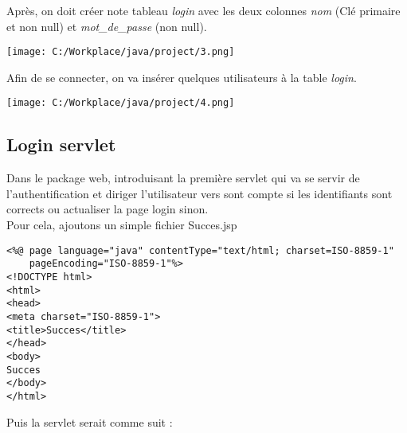\documentclass[12]{article}
\begin{document}
Après, on doit créer note tableau \textit{login} avec les deux colonnes \textit{nom} (Clé primaire et non null) et \textit{mot\_de\_passe} (non null).\\

\begin{center}
\texttt{[image: C:/Workplace/java/project/3.png]}
\end{center}

Afin de se connecter, on va insérer quelques utilisateurs à la table \textit{login}.\\


\begin{center}
\texttt{[image: C:/Workplace/java/project/4.png]}
\end{center}






\subsection{Login servlet}

Dans le package web, introduisant la première servlet qui va se servir de l'authentification et diriger l'utilisateur vers sont compte si les identifiants sont corrects ou actualiser la page login sinon.\\

Pour cela, ajoutons un simple fichier Succes.jsp \\

\lstset{language=XML}
\begin{lstlisting}
<%@ page language="java" contentType="text/html; charset=ISO-8859-1"
    pageEncoding="ISO-8859-1"%>
<!DOCTYPE html>
<html>
<head>
<meta charset="ISO-8859-1">
<title>Succes</title>
</head>
<body>
Succes
</body>
</html>
\end{lstlisting}


\newpage

Puis la servlet serait comme suit :\\
\end{document}
